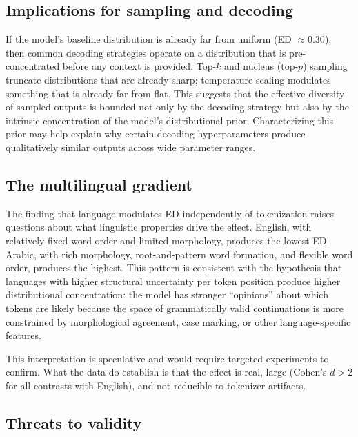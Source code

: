 \documentclass{article}
\begin{document}
\subsection{Implications for sampling and decoding}

If the model's baseline distribution is already far from uniform (ED $\approx 0.30$), then common decoding strategies operate on a distribution that is pre-concentrated before any context is provided. Top-$k$ and nucleus (top-$p$) sampling~\citep{holtzman2020curious} truncate distributions that are already sharp; temperature scaling modulates something that is already far from flat. This suggests that the effective diversity of sampled outputs is bounded not only by the decoding strategy but also by the intrinsic concentration of the model's distributional prior. Characterizing this prior may help explain why certain decoding hyperparameters produce qualitatively similar outputs across wide parameter ranges.

\subsection{The multilingual gradient}

The finding that language modulates ED independently of tokenization raises questions about what linguistic properties drive the effect. English, with relatively fixed word order and limited morphology, produces the lowest ED. Arabic, with rich morphology, root-and-pattern word formation, and flexible word order, produces the highest. This pattern is consistent with the hypothesis that languages with higher structural uncertainty per token position produce higher distributional concentration: the model has stronger ``opinions'' about which tokens are likely because the space of grammatically valid continuations is more constrained by morphological agreement, case marking, or other language-specific features.

This interpretation is speculative and would require targeted experiments to confirm. What the data do establish is that the effect is real, large (Cohen's $d > 2$ for all contrasts with English), and not reducible to tokenizer artifacts.

\subsection{Threats to validity}
\end{document}

